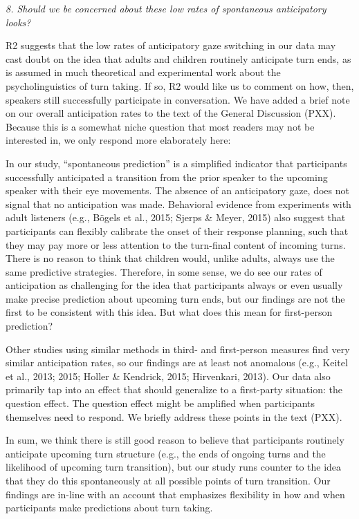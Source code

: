 \documentclass[11pt,a4paper]{letter} %
\begin{document}
\begin{letter}{}
\noindent \textit{8. Should we be concerned about these low rates of spontaneous anticipatory looks?}

\noindent R2 suggests that the low rates of anticipatory gaze switching in our data may cast doubt on the idea that adults and children routinely anticipate turn ends, as is assumed in much theoretical and experimental work about the psycholinguistics of turn taking. If so, R2 would like us to comment on how, then, speakers still successfully participate in conversation. We have added a brief note on our overall anticipation rates to the text of the General Discussion (PXX). Because this is a somewhat niche question that most readers may not be interested in, we only respond more elaborately here:

\noindent In our study, ``spontaneous prediction'' is a simplified indicator that participants successfully anticipated a transition from the prior speaker to the upcoming speaker with their eye movements. The absence of an anticipatory gaze, does not signal that no anticipation was made. Behavioral evidence from experiments with adult listeners (e.g., B\"{o}gels et al., 2015; Sjerps \& Meyer, 2015) also suggest that participants can flexibly calibrate the onset of their response planning, such that they may pay more or less attention to the turn-final content of incoming turns. There is no reason to think that children would, unlike adults, always use the same predictive strategies. Therefore, in some sense, we do see our rates of anticipation as challenging for the idea that participants always or even usually make precise prediction about upcoming turn ends, but our findings are not the first to be consistent with this idea. But what does this mean for first-person prediction?

\noindent Other studies using similar methods in third- and first-person measures find very similar anticipation rates, so our findings are at least not anomalous (e.g., Keitel et al., 2013; 2015; Holler \& Kendrick, 2015; Hirvenkari, 2013). Our data also primarily tap into an effect that should generalize to a first-party situation: the question effect. The question effect might be amplified when participants themselves need to respond. We briefly address these points in the text (PXX).

\noindent In sum, we think there is still good reason to believe that participants routinely anticipate upcoming turn structure (e.g., the ends of ongoing turns and the likelihood of upcoming turn transition), but our study runs counter to the idea that they do this spontaneously at all possible points of turn transition. Our findings are in-line with an account that emphasizes flexibility in how and when participants make predictions about turn taking.


\end{letter}
\end{document}
